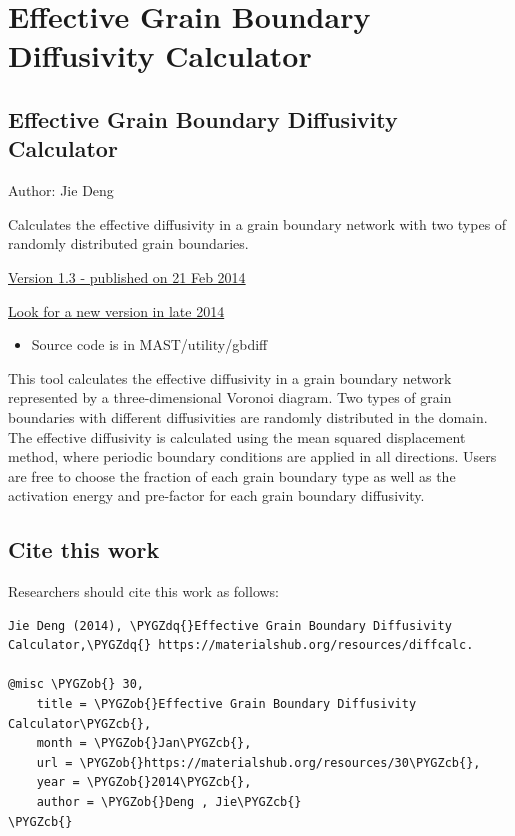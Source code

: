 \documentclass[letterpaper,10pt,english]{sphinxmanual}
\def\PYGZob{\char`\{}
\def\PYGZcb{\char`\}}
\def\PYGZdq{\char`\"}
\begin{document}
\section{Effective Grain Boundary Diffusivity Calculator}
\label{8_0_standalonetools:effective-grain-boundary-diffusivity-calculator}

\subsection{Effective Grain Boundary Diffusivity Calculator}
\label{8_0_2_gbdiff:effective-grain-boundary-diffusivity-calculator}\label{8_0_2_gbdiff::doc}
Author: Jie Deng

Calculates the effective diffusivity in a grain boundary network with two types of randomly distributed grain boundaries.

\href{https://materialshub.org/resources/diffcalc}{Version 1.3 - published on 21 Feb 2014}

\href{https://materialshub.org/resources/gbdiff}{Look for a new version in late 2014}
\begin{itemize}
\item {} 
Source code is in MAST/utility/gbdiff

\end{itemize}

This tool calculates the effective diffusivity in a grain boundary network represented by a three-dimensional Voronoi diagram.
Two types of grain boundaries with different diffusivities are randomly distributed in the domain.
The effective diffusivity is calculated using the mean squared displacement method, where periodic boundary conditions are applied in all directions.
Users are free to choose the fraction of each grain boundary type as well as the activation energy and pre-factor for each grain boundary diffusivity.


\subsection{Cite this work}
\label{8_0_2_gbdiff:cite-this-work}
Researchers should cite this work as follows:

\begin{Verbatim}[commandchars=\\\{\}]
Jie Deng (2014), \PYGZdq{}Effective Grain Boundary Diffusivity Calculator,\PYGZdq{} https://materialshub.org/resources/diffcalc.

@misc \PYGZob{} 30,
    title = \PYGZob{}Effective Grain Boundary Diffusivity Calculator\PYGZcb{},
    month = \PYGZob{}Jan\PYGZcb{},
    url = \PYGZob{}https://materialshub.org/resources/30\PYGZcb{},
    year = \PYGZob{}2014\PYGZcb{},
    author = \PYGZob{}Deng , Jie\PYGZcb{}
\PYGZcb{}
\end{Verbatim}
\end{document}
